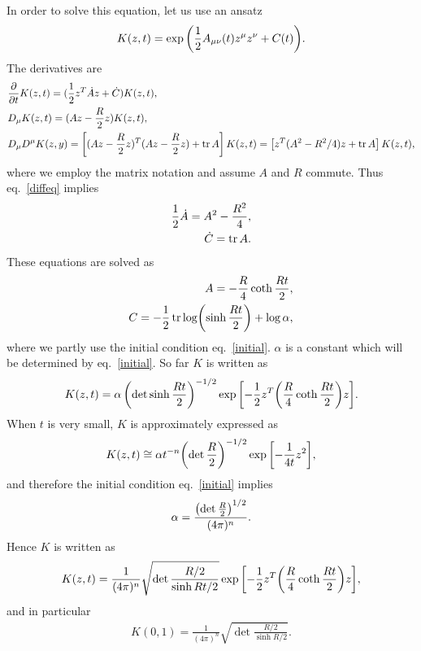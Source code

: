 \documentclass[12pt,a4paper]{article}
\begin{document}
In order to solve this equation, let us use an ansatz
\begin{align}
  K(z,t)=\exp\qty(\frac12 A_{\mu\nu}(t)z^{\mu}z^{\nu}+C(t)).
\end{align}
The derivatives are
\begin{align}
   & \pdv{t} K(z,t)=(\frac12 z^T \dot{A} z + \dot{C}) K(z,t),                                    \\
   & D_{\mu} K(z,t)=(A z - \frac{R}{2}z)K(z,t),                                                  \\
   & D_{\mu}D^{\mu}K(z,y)=\left[(A z - \frac{R}{2}z)^{T}(A z - \frac{R}{2}z)+\tr A\right] K(z,t)
  =\left[z^T(A^2-R^2/4)z+\tr A\right]K(z,t),
\end{align}
where we employ the matrix notation and assume $A$ and $R$ commute.
Thus eq.~\eqref{diffeq} implies
\begin{align}
  \frac12 \dot{A}=A^2-\frac{R^2}{4}, \\
  \dot{C}=\tr A.
\end{align}
These equations are solved as
\begin{align}
  A=-\frac{R}{4}\coth\frac{Rt}{2}, \\
  C=-\frac12 \tr \log(\sinh\frac{Rt}{2})+\log \alpha,
\end{align}
where we partly use the initial condition eq.~\eqref{initial}. $\alpha$ is a constant which will be determined by eq.~\eqref{initial}.  So far $K$ is written as
\begin{align}
  K(z,t)=\alpha \left(\det \sinh \frac{Rt}{2}\right)^{-1/2}
  \exp\qty[-\frac12 z^T \qty(\frac{R}{4}\coth\frac{Rt}{2}) z ].
\end{align}
When $t$ is very small, $K$ is approximately expressed as
\begin{align}
  K(z,t)\cong \alpha t^{-n}\qty(\det \frac{R}{2})^{-1/2}
  \exp\qty[-\frac{1}{4t}z^2],
\end{align}
and therefore the initial condition eq.~\eqref{initial} implies
\begin{align}
  \alpha=\frac{\qty(\det \frac{R}{2})^{1/2}}{(4\pi)^n}.
\end{align}
Hence $K$ is written as
\begin{align}
  K(z,t)=\frac{1}{(4\pi)^n}
  \sqrt{\det\frac{R/2}{\sinh Rt/2}}
  \exp\qty[-\frac12 z^T \qty(\frac{R}{4}\coth\frac{Rt}{2}) z ],
\end{align}
and in particular
\begin{align}
  K(0,1)=\frac{1}{(4\pi)^n}
  \sqrt{\det\frac{R/2}{\sinh R/2}}. \label{kernel}
\end{align}
\end{document}
